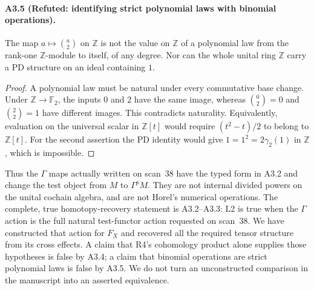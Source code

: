 \paragraph{A3.5 (Refuted: identifying strict polynomial laws with binomial operations).}
\label{A3.5}
The map $a\mapsto\binom a2$ on $\mathbb Z$ is not the value on
$\mathbb Z$ of a polynomial law from the rank-one $\mathbb Z$-module
to itself, of any degree. Nor can the whole unital ring $\mathbb Z$
carry a PD structure on an ideal containing $1$.

\begin{proof}
A polynomial law must be natural under every commutative base change.
Under $\mathbb Z\to\mathbb F_2$, the inputs $0$ and $2$ have the same
image, whereas $\binom02=0$ and $\binom22=1$ have different images.
This contradicts naturality. Equivalently, evaluation on the universal
scalar in $\mathbb Z[t]$ would require $(t^2-t)/2$ to belong to
$\mathbb Z[t]$. For the second assertion the PD identity would give
$1=1^2=2\gamma_2(1)$ in $\mathbb Z$, which is impossible.
\end{proof}

Thus the $\Gamma$ maps actually written on scan~38 have the typed
form in A3.2 and change the test object from $M$ to $\Gamma^pM$.
They are not internal divided powers on the unital cochain algebra,
and are not Horel's numerical operations. The complete, true
homotopy-recovery statement is A3.2--A3.3: L2 is true when the
$\Gamma$ action is the full natural test-functor action requested
on scan~38. We have constructed that action for $F_X$ and recovered
all the required tensor structure from its cross effects. A claim that R4's
cohomology product alone supplies those hypotheses is false by A3.4;
a claim that binomial operations are strict polynomial laws is false
by A3.5. We do not turn an unconstructed comparison in the manuscript
into an asserted equivalence.
